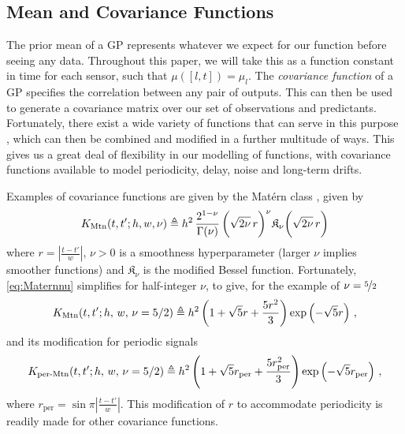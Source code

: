 \documentclass{acmtrans2m}
\newcommand{\Kl}[1]{K_{\text{#1}}}
\begin{document}
\subsection{Mean and Covariance Functions}

\noindent The prior mean of a GP represents whatever we expect for our function before seeing any data. Throughout this paper, we will take this as a function constant in time for each sensor, such that $\mu([l,t])=\mu_l$. The \emph{covariance function} of a GP specifies the correlation between any pair of outputs. This can then be used to generate a covariance matrix over our set of observations and predictants. Fortunately, there exist a wide variety of functions that can serve in this purpose \cite{Abrahamsen,stein2005stc}, which can then be combined and modified in a further multitude of ways. This gives us a great deal of flexibility in our modelling of functions, with covariance functions available to model periodicity, delay, noise and long-term drifts. 

Examples of covariance functions are given by the Mat\'{e}rn class \cite{GPsBook}, given by
\begin{equation} \label{eq:Maternnu}
\Kl{Mtn}(t,t';h,w,\nu)\defequal h^2\,\frac{2^{1-\nu}}{\Gamma(\nu)}\,\biggl(\sqrt{2\nu}\,r\biggr)^\nu \mathfrak{K}_\nu\biggl(\sqrt{2\nu}\,r\biggr)
\end{equation}
where $r = \left|\frac{t-t'}{w}\right|$, $\nu>0$ is a smoothness hyperparameter (larger $\nu$ implies smoother functions) and $\mathfrak{K}_\nu$ is the modified Bessel function. Fortunately, \eqref{eq:Maternnu} simplifies for half-integer $\nu$, to give, for the example of $\nu=\nicefrac{5}{2}$
\begin{equation} \label{eq:matern}
\Kl{Mtn}(t,t';h,\,w,\,\nu=5/2) \defequal h^2 \left(1+\sqrt{5}r+\frac{5r^2}{3}\right)\exp\left(-\sqrt{5}r\right)\,,
\end{equation}
and its modification for periodic signals
\begin{equation} \label{eq:permatern}
\Kl{per-Mtn}(t,t';h,\,w,\,\nu=5/2) \defequal h^2 \left(1+\sqrt{5}r_{\text{per}}+\frac{5r_{\text{per}}^2}{3}\right)\exp\left(-\sqrt{5}r_{\text{per}}\right)\,,
\end{equation}
where $r_{\text{per}} = \sin \pi \left|\frac{t-t'}{w}\right|$. This modification of $r$ to accommodate periodicity is readily made for other covariance functions.
\end{document}

